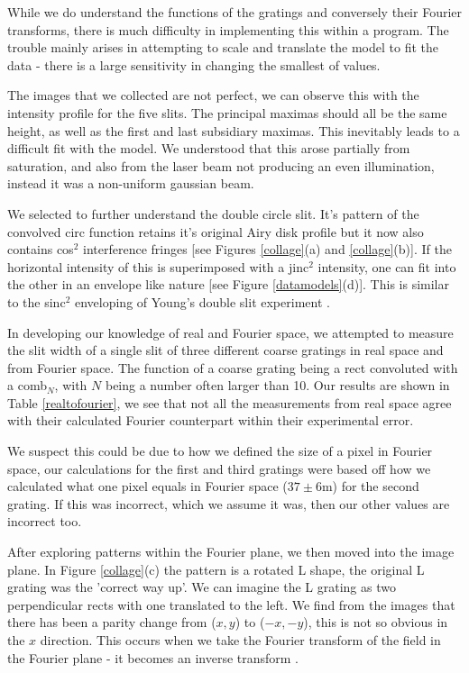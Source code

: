 \documentclass[twocolumn]{revtex4}
\begin{document}
While we do understand the functions of the gratings and conversely their Fourier transforms, there is much difficulty in implementing this within a program. The trouble mainly arises in attempting to scale and translate the model to fit the data - there is a large sensitivity in changing the smallest of values.

The images that we collected are not perfect, we can observe this with the intensity profile for the five slits. The principal maximas should all be the same height, as well as the first and last subsidiary maximas. This inevitably leads to a difficult fit with the model. We understood that this arose partially from saturation, and also from the laser beam not producing an even illumination, instead it was a non-uniform gaussian beam.

We selected to further understand the double circle slit. It's pattern of the convolved circ function retains it's original Airy disk profile but it now also contains cos$^2$ interference fringes [see Figures \ref{collage}(a) and \ref{collage}(b)]. If the horizontal intensity of this is superimposed with a jinc$^2$ intensity, one can fit into the other in an envelope like nature [see Figure \ref{datamodels}(d)]. This is similar to the sinc$^2$ enveloping of Young's double slit experiment \cite{of2f}.

In developing our knowledge of real and Fourier space, we attempted to measure the slit width of a single slit of three different coarse gratings in real space and from Fourier space. The function of a coarse grating being a rect convoluted with a comb$_N$, with $N$ being a number often larger than 10. Our results are shown in Table \ref{realtofourier}, we see that not all the measurements from real space agree with their calculated Fourier counterpart within their experimental error.

We suspect this could be due to how we defined the size of a pixel in Fourier space, our calculations for the first and third gratings were based off how we calculated what one pixel equals in Fourier space ($37\pm6$m) for the second grating. If this was incorrect, which we assume it was, then our other values are incorrect too.

After exploring patterns within the Fourier plane, we then moved into the image plane. In Figure \ref{collage}(c) the pattern is a rotated L shape, the original L grating was the 'correct way up'. We can imagine the L grating as two perpendicular rects with one translated to the left. We find from the images that there has been a parity change from ($x,y$) to ($-x,-y$), this is not so obvious in the $x$ direction. This occurs when we take the Fourier transform of the field in the Fourier plane - it becomes an inverse transform \cite{of2f}. 
\end{document}
